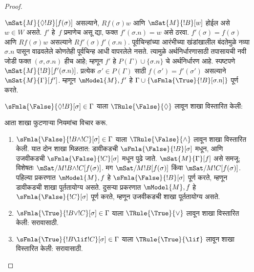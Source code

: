 \documentclass[../../../include/open-logic-section]{subfiles}
\begin{document}
\begin{proof}
\begin{enumerate}
{{  $\mSat{M}{\Diamond !B}[f(\sigma)]$ असल्याने,
  $Rf(\sigma)w$ आणि $\mSat{M}{!B}[w]$
  होईल असे $w \in W$ असते. $f'$ हे~$f$
  प्रमाणेच असू द्या, फक्त
  $f'(\sigma.n) = w$ असे ठरवा.
  $f'(\sigma) = f(\sigma)$ आणि
  $Rf(\sigma)w$ असल्याने
  $Rf'(\sigma)f'(\sigma.n)$.
  पूर्वचिन्हांच्या आरंभीच्या खंडांखालील बंदतेमुळे नव्या
  $\sigma.n$ पासून वाढवलेले कोणतेही पूर्वचिन्ह आधी वापरलेले
  नसते. त्यामुळे अर्थनिर्धारणासाठी तपासायची नवी जोडी फक्त
  $(\sigma,\sigma.n)$ हीच आहे; म्हणून $f'$
  हे $P(\Gamma) \cup \{\sigma.n\}$ चे
  अर्थनिर्धारण आहे. स्पष्टपणे
  $\mSat{M}{!B}[f'(\sigma.n)]$.
  प्रत्येक $\sigma' \in P(\Gamma)$ साठी
  $f(\sigma') = f'(\sigma')$ असल्याने
  $\mSat{M}{\Gamma}[f']$. म्हणून
  $\mModel{M}, f'$ हे $\Gamma \cup
  \{\sFmla{\True}{!B}[\sigma.n]\}$ पूर्ण करते.}
\item $\sFmla{\False}{\Diamond !B}[\sigma] \in \Gamma$
  याला
  $\TRule{\False}{\Diamond}$ लावून शाखा विस्तारित
  केली: 
  }{}
\end{enumerate}
आता शाखा फुटणाऱ्या नियमांचा विचार करू.
\begin{enumerate}
\item $\sFmla{\False}{!B \land !C}[\sigma] \in \Gamma$
  याला
  $\TRule{\False}{\land}$ लावून शाखा विस्तारित
  केली. यात दोन शाखा मिळतात: डावीकडची
  $\sFmla{\False}{!B}[\sigma]$ मधून, आणि
  उजवीकडची $\sFmla{\False}{!C}[\sigma]$
  मधून पुढे जाते. $\mSat{M}{\Gamma}[f]$
  असे समजू; विशेषतः
  $\mSat/{M}{!B \land !C}[f(\sigma)]$.
  मग $\mSat/{M}{!B}[f(\sigma)]$ किंवा
  $\mSat/{M}{!C}[f(\sigma)]$.
  पहिल्या प्रकरणात $\mModel{M}, f$ हे
  $\sFmla{\False}{!B}[\sigma]$ पूर्ण करते,
  म्हणून डावीकडची शाखा पूर्ततायोग्य असते.
  दुसऱ्या प्रकरणात $\mModel{M}, f$ हे
  $\sFmla{\False}{!C}[\sigma]$ पूर्ण करते,
  म्हणून उजवीकडची शाखा पूर्ततायोग्य असते.
\item $\sFmla{\True}{!B \lor !C}[\sigma] \in \Gamma$
  याला
  $\TRule{\True}{\lor}$ लावून शाखा विस्तारित
  केली: सरावासाठी.
\item $\sFmla{\True}{!B \lif !C}[\sigma] \in \Gamma$
  याला
  $\TRule{\True}{\lif}$ लावून शाखा विस्तारित
  केली: सरावासाठी.
\end{enumerate}
\end{proof}
\end{document}
